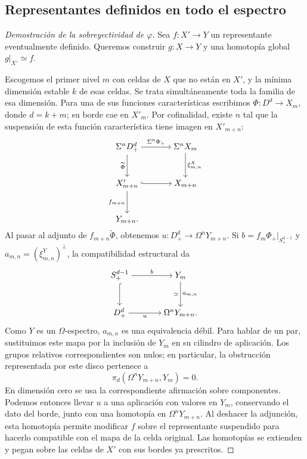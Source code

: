 \subsection{Representantes definidos en todo el espectro}

\begin{proof}[Demostración de la sobreyectividad de $\varphi$]
Sea $f\colon X'\to Y$ un representante eventualmente definido. Queremos construir $g\colon X\to Y$ y una homotopía global $g|_{X'}\simeq f$.

Escogemos el primer nivel $m$ con celdas de $X$ que no están en $X'$, y la mínima dimensión estable $k$ de esas celdas. Se trata simultáneamente toda la familia de esa dimensión. Para una de sus funciones características escribimos $\Phi\colon D^d\to X_m$, donde $d=k+m$; su borde cae en $X'_m$. Por cofinalidad, existe $n$ tal que la suspensión de esta función característica tiene imagen en $X'_{m+n}$:
\[
\begin{tikzcd}[cramped,column sep=large,row sep=large]
\Sigma^nD^d_+ \arrow[r,"\Sigma^n\Phi_+"] \arrow[d,"\widetilde\Phi"']
& \Sigma^nX_m \arrow[d,"\xi^X_{m,n}"]\\
X'_{m+n} \arrow[r,hook] \arrow[d,"f_{m+n}"'] & X_{m+n}\\
Y_{m+n}. &
\end{tikzcd}
\]
Al pasar al adjunto de $f_{m+n}\widetilde\Phi$, obtenemos $u\colon D^d_+\to\Omega^nY_{m+n}$. Si $b=f_m\Phi_+|_{S^{d-1}_+}$ y $a_{m,n}=(\xi^Y_{m,n})^\perp$, la compatibilidad estructural da
\[
\begin{tikzcd}[cramped,column sep=large,row sep=large]
S^{d-1}_+ \arrow[r,"b"] \arrow[d,hook]
& Y_m \arrow[d,"a_{m,n}","\simeq"']\\
D^d_+ \arrow[r,"u"'] & \Omega^nY_{m+n}.
\end{tikzcd}
\]
Como $Y$ es un $\Omega$-espectro, $a_{m,n}$ es una equivalencia débil. Para hablar de un par, sustituimos este mapa por la inclusión de $Y_m$ en su cilindro de aplicación. Los grupos relativos correspondientes son nulos; en particular, la obstrucción representada por este disco pertenece a
\[
\pi_d(\Omega^nY_{m+n},Y_m)=0.
\]
En dimensión cero se usa la correspondiente afirmación sobre componentes. Podemos entonces llevar $u$ a una aplicación con valores en $Y_m$, conservando el dato del borde, junto con una homotopía en $\Omega^nY_{m+n}$. Al deshacer la adjunción, esta homotopía permite modificar $f$ sobre el representante suspendido para hacerlo compatible con el mapa de la celda original. Las homotopías se extienden y pegan sobre las celdas de $X'$ con sus bordes ya prescritos.


\end{proof}
